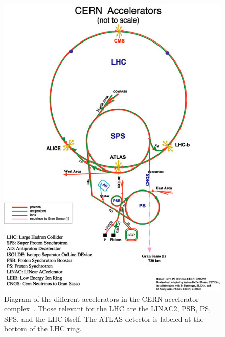 \begin{figure}[ht]
\centering
\includegraphics[width=.8\textwidth]{figures/lhc/complex.jpg}
\caption{Diagram of the different accelerators in the CERN accelerator
complex~\cite{lhccomplex}. Those relevant for the LHC are the LINAC2, 
PSB, PS, SPS, and the LHC itself. The ATLAS detector is labeled 
at the bottom of the LHC ring.}
\label{fig:lhc_complex}
\end{figure}

